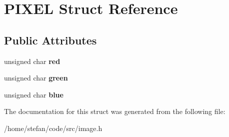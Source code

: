 \hypertarget{structPIXEL}{}\section{P\+I\+X\+EL Struct Reference}
\label{structPIXEL}
\subsection*{Public Attributes}
\begin{DoxyCompactItemize}
\item 
\mbox{\label{structPIXEL_a17bc4c45a1352bd3b17a1531c7447777}} 
unsigned char {\bfseries red}
\item 
\mbox{\label{structPIXEL_a33766b745b260fb5d24bb56953d19bca}} 
unsigned char {\bfseries green}
\item 
\mbox{\label{structPIXEL_a76cf1ee41fdebff7873b728b93c9c338}} 
unsigned char {\bfseries blue}
\end{DoxyCompactItemize}


The documentation for this struct was generated from the following file\+:\begin{DoxyCompactItemize}
\item 
/home/stefan/code/src/image.\+h\end{DoxyCompactItemize}
